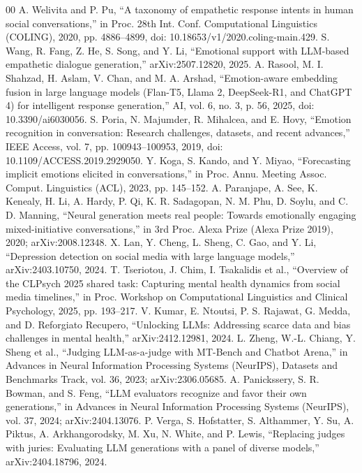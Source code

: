 \documentclass[conference]{IEEEtran}
\begin{document}
\begin{thebibliography}{00}
 A. Welivita and P. Pu, ``A taxonomy of empathetic response intents in human social conversations,'' in Proc. 28th Int. Conf. Computational Linguistics (COLING), 2020, pp. 4886--4899, doi: 10.18653/v1/2020.coling-main.429.
 S. Wang, R. Fang, Z. He, S. Song, and Y. Li, ``Emotional support with LLM-based empathetic dialogue generation,'' arXiv:2507.12820, 2025.
 A. Rasool, M. I. Shahzad, H. Aslam, V. Chan, and M. A. Arshad, ``Emotion-aware embedding fusion in large language models (Flan-T5, Llama 2, DeepSeek-R1, and ChatGPT 4) for intelligent response generation,'' AI, vol. 6, no. 3, p. 56, 2025, doi: 10.3390/ai6030056.
 S. Poria, N. Majumder, R. Mihalcea, and E. Hovy, ``Emotion recognition in conversation: Research challenges, datasets, and recent advances,'' IEEE Access, vol. 7, pp. 100943--100953, 2019, doi: 10.1109/ACCESS.2019.2929050.
 Y. Koga, S. Kando, and Y. Miyao, ``Forecasting implicit emotions elicited in conversations,'' in Proc. Annu. Meeting Assoc. Comput. Linguistics (ACL), 2023, pp. 145--152.
 A. Paranjape, A. See, K. Kenealy, H. Li, A. Hardy, P. Qi, K. R. Sadagopan, N. M. Phu, D. Soylu, and C. D. Manning, ``Neural generation meets real people: Towards emotionally engaging mixed-initiative conversations,'' in 3rd Proc. Alexa Prize (Alexa Prize 2019), 2020; arXiv:2008.12348.
 X. Lan, Y. Cheng, L. Sheng, C. Gao, and Y. Li, ``Depression detection on social media with large language models,'' arXiv:2403.10750, 2024.
 T. Tseriotou, J. Chim, I. Tsakalidis et al., ``Overview of the CLPsych 2025 shared task: Capturing mental health dynamics from social media timelines,'' in Proc. Workshop on Computational Linguistics and Clinical Psychology, 2025, pp. 193--217.
 V. Kumar, E. Ntoutsi, P. S. Rajawat, G. Medda, and D. Reforgiato Recupero, ``Unlocking LLMs: Addressing scarce data and bias challenges in mental health,'' arXiv:2412.12981, 2024.
 L. Zheng, W.-L. Chiang, Y. Sheng et al., ``Judging LLM-as-a-judge with MT-Bench and Chatbot Arena,'' in Advances in Neural Information Processing Systems (NeurIPS), Datasets and Benchmarks Track, vol. 36, 2023; arXiv:2306.05685.
 A. Panickssery, S. R. Bowman, and S. Feng, ``LLM evaluators recognize and favor their own generations,'' in Advances in Neural Information Processing Systems (NeurIPS), vol. 37, 2024; arXiv:2404.13076.
 P. Verga, S. Hofstatter, S. Althammer, Y. Su, A. Piktus, A. Arkhangorodsky, M. Xu, N. White, and P. Lewis, ``Replacing judges with juries: Evaluating LLM generations with a panel of diverse models,'' arXiv:2404.18796, 2024.

\end{thebibliography}
\end{document}

